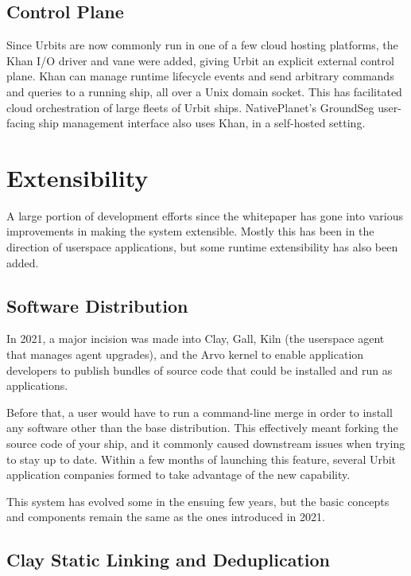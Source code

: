 \documentclass[twoside]{article}
\begin{document}
\subsection{Control Plane}

Since Urbits are now commonly run in one of a few cloud hosting platforms, the Khan I/O driver and vane were added, giving Urbit an explicit external control plane.  Khan can manage runtime lifecycle events and send arbitrary commands and queries to a running ship, all over a Unix domain socket.  This has facilitated cloud orchestration of large fleets of Urbit ships.  NativePlanet's GroundSeg user-facing ship management interface \citep{GroundSeg} also uses Khan, in a self-hosted setting.

\section{Extensibility}

A large portion of development efforts since the whitepaper has gone into various improvements in making the system extensible.  Mostly this has been in the direction of userspace applications, but some runtime extensibility has also been added.

\subsection{Software Distribution}

In 2021, a major incision was made into Clay, Gall, Kiln (the userspace agent that manages agent upgrades), and the Arvo kernel to enable application developers to publish bundles of source code that could be installed and run as applications.

Before that, a user would have to run a command-line merge in order to install any software other than the base distribution.  This effectively meant forking the source code of your ship, and it commonly caused downstream issues when trying to stay up to date.  Within a few months of launching this feature, several Urbit application companies formed to take advantage of the new capability.

This system has evolved some in the ensuing few years, but the basic concepts and components remain the same as the ones introduced in 2021.

\subsection{Clay Static Linking and Deduplication}
\end{document}
